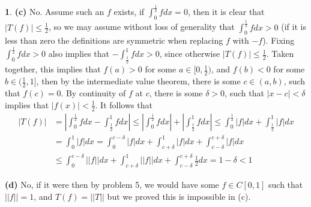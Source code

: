 \documentclass[10.5pt]{article}
\theoremstyle{definition}
\newtheorem{pb}{}
\newcommand{\abs}[1]{\left\vert#1\right\vert}
\newcommand{\norm}[1]{\lvert\lvert#1\rvert\rvert}
\begin{document}
\begin{pb}
            \textbf{(c)} No. Assume such an \(f\) exists, if \(\int_0^{\frac12} fdx = 0\), then it is clear that \(\abs{T(f)} \leq \frac12\), so we may assume without loss of generality that \(\int_0^\frac12 f dx > 0\) (if it is less than zero the definitions are symmetric when replacing \(f\) with \(-f\)). Fixing \(\int_0^\frac12 fdx > 0\) also implies that \(-\int_\frac12^1 f dx > 0\), since otherwise \(\abs{T(f)} \leq \frac12\). Taken together, this implies that \(f(a) > 0\) for some \(a \in [0,\frac12)\), and \(f(b) < 0\) for some \(b \in (\frac12,1]\), then by the intermediate value theorem, there is some \(c \in (a,b)\), such that \(f(c) = 0\). By continuity of \(f\) at \(c\), there is some \(\delta > 0\), such that \(\abs{x - c} < \delta\) implies that \(\abs{f(x)} < \frac12\). It follows that
            \begin{align*}
                \abs{T(f)} &= \abs{\int_0^{\frac12}fdx - \int_{\frac12}^1fdx} \leq \abs{\int_0^\frac12 fdx} + \abs{\int_\frac12^1 fdx} \leq \int_0^\frac12 \abs{f}dx + \int_\frac12^1 \abs{f}dx \\ 
                &= \int_0^1 \abs{f}dx = \int_0^{c - \delta}\abs{f}dx + \int_{c + \delta}^1\abs{f}dx + \int_{c - \delta}^{c + \delta}\abs{f}dx \\
                &\leq \int_0^{c-\delta} \norm{f}dx + \int_{c+\delta}^1 \norm{f}dx + \int_{c - \delta}^{c + \delta}\frac12dx = 1 - \delta < 1
            \end{align*}

            \textbf{(d)} No, if it were then by problem 5, we would have some \(f \in C[0,1]\) such that \(\norm{f} = 1\), and \(T(f) = \norm{T}\) but we proved this is impossible in (c).
            
        \end{pb}
\end{document}
